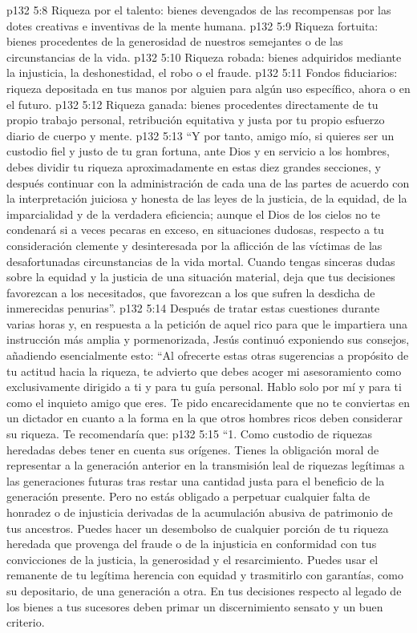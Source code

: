 \vs p132 5:8 Riqueza por el talento: bienes devengados de las recompensas por las dotes creativas e inventivas de la mente humana.
\vs p132 5:9 Riqueza fortuita: bienes procedentes de la generosidad de nuestros semejantes o de las circunstancias de la vida.
\vs p132 5:10 Riqueza robada: bienes adquiridos mediante la injusticia, la deshonestidad, el robo o el fraude.
\vs p132 5:11 Fondos fiduciarios: riqueza depositada en tus manos por alguien para algún uso específico, ahora o en el futuro.
\vs p132 5:12 Riqueza ganada: bienes procedentes directamente de tu propio trabajo personal, retribución equitativa y justa por tu propio esfuerzo diario de cuerpo y mente.
\vs p132 5:13 \pc “Y por tanto, amigo mío, si quieres ser un custodio fiel y justo de tu gran fortuna, ante Dios y en servicio a los hombres, debes dividir tu riqueza aproximadamente en estas diez grandes secciones, y después continuar con la administración de cada una de las partes de acuerdo con la interpretación juiciosa y honesta de las leyes de la justicia, de la equidad, de la imparcialidad y de la verdadera eficiencia; aunque el Dios de los cielos no te condenará si a veces pecaras en exceso, en situaciones dudosas, respecto a tu consideración clemente y desinteresada por la aflicción de las víctimas de las desafortunadas circunstancias de la vida mortal. Cuando tengas sinceras dudas sobre la equidad y la justicia de una situación material, deja que tus decisiones favorezcan a los necesitados, que favorezcan a los que sufren la desdicha de inmerecidas penurias”.
\vs p132 5:14 Después de tratar estas cuestiones durante varias horas y, en respuesta a la petición de aquel rico para que le impartiera una instrucción más amplia y pormenorizada, Jesús continuó exponiendo sus consejos, añadiendo esencialmente esto: “Al ofrecerte estas otras sugerencias a propósito de tu actitud hacia la riqueza, te advierto que debes acoger mi asesoramiento como exclusivamente dirigido a ti y para tu guía personal. Hablo solo por mí y para ti como el inquieto amigo que eres. Te pido encarecidamente que no te conviertas en un dictador en cuanto a la forma en la que otros hombres ricos deben considerar su riqueza. Te recomendaría que:
\vs p132 5:15 \pc “1. Como custodio de riquezas heredadas debes tener en cuenta sus orígenes. Tienes la obligación moral de representar a la generación anterior en la transmisión leal de riquezas legítimas a las generaciones futuras tras restar una cantidad justa para el beneficio de la generación presente. Pero no estás obligado a perpetuar cualquier falta de honradez o de injusticia derivadas de la acumulación abusiva de patrimonio de tus ancestros. Puedes hacer un desembolso de cualquier porción de tu riqueza heredada que provenga del fraude o de la injusticia en conformidad con tus convicciones de la justicia, la generosidad y el resarcimiento. Puedes usar el remanente de tu legítima herencia con equidad y trasmitirlo con garantías, como su depositario, de una generación a otra. En tus decisiones respecto al legado de los bienes a tus sucesores deben primar un discernimiento sensato y un buen criterio.
